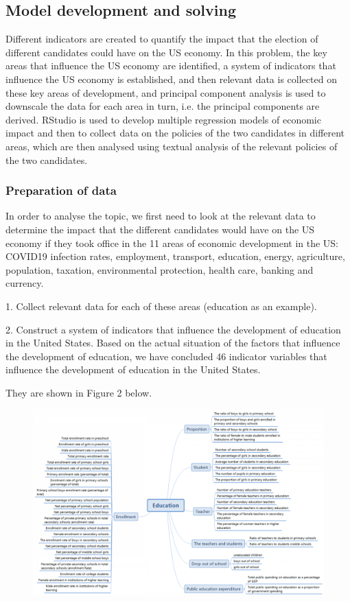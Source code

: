 \documentclass{apmcmthesis}
\begin{document}
\subsection{Model development and solving} %
Different indicators are created to quantify the impact that the election of different candidates could have on the US economy.
In this problem, the key areas that influence the US economy are identified, a system of indicators that influence the US economy is established, and then relevant data is collected on these key areas of development, and principal component analysis is used to downscale the data for each area in turn, i.e. the principal components are derived. RStudio is used to develop multiple regression models of economic impact and then to collect data on the policies of the two candidates in different areas, which are then analysed using textual analysis of the relevant policies of the two candidates.

\subsubsection{Preparation of data}
In order to analyse the topic, we first need to look at the relevant data to determine the impact that the different candidates would have on the US economy if they took office in the 11 areas of economic development in the US: COVID19 infection rates, employment, transport, education, energy, agriculture, population, taxation, environmental protection, health care, banking and currency.

1. Collect relevant data for each of these areas (education as an example).

2. Construct a system of indicators that influence the development of education in the United States.
Based on the actual situation of the factors that influence the development of education, we have concluded 46 indicator variables that influence the development of education in the United States. 

They are shown in Figure 2 below.

\begin{figure}[H]
	\centering
	\includegraphics[width=\linewidth]{screenshot003}
	\caption{}
	\label{fig:screenshot003}
\end{figure}
\end{document}
